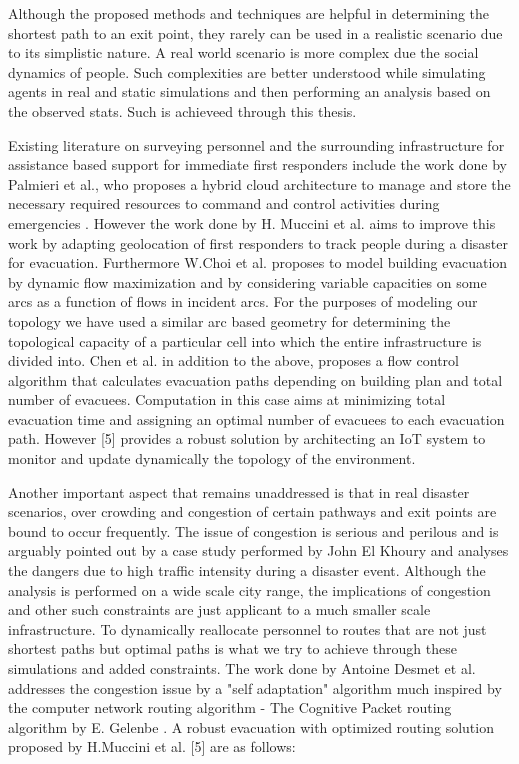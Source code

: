 Although the proposed methods and techniques are helpful in determining the shortest path to an exit point, they rarely can be used in a realistic scenario due to its simplistic nature. A real world scenario is more complex due the social dynamics of people. Such complexities are better understood while simulating agents in real and static simulations and then performing an analysis based on the observed stats. Such is achieveed through this thesis.

Existing literature on surveying personnel and the surrounding infrastructure for assistance based support for immediate first responders include the work done by Palmieri et al., who proposes a hybrid cloud architecture to manage and store the necessary required resources to command and control activities during emergencies \cite{ref14}. However the work done by H. Muccini et al. \cite{ref5} aims to improve this work by adapting geolocation of first responders to track people during a disaster for evacuation. Furthermore W.Choi et al. \cite{ref15} proposes to model building evacuation by dynamic flow maximization and by considering variable capacities on some arcs as a function of flows in incident arcs. For the purposes of modeling our topology we have used a similar arc based geometry for determining the topological capacity of a particular cell into which the entire infrastructure is divided into. Chen et al. \cite{ref16} in addition to the above, proposes a flow control algorithm that calculates evacuation paths depending on building plan and total number of
evacuees. Computation in this case aims at minimizing total evacuation time and assigning an optimal number of evacuees to each evacuation path. However [5] provides a robust solution by architecting an IoT system to monitor and update dynamically the topology of the environment.

Another important aspect that remains unaddressed is that in real disaster scenarios, over crowding and congestion of certain pathways and exit points are bound to occur frequently. The issue of congestion is serious and perilous and is arguably pointed out by a case study performed by John El Khoury \cite{ref17} and analyses the dangers due to high traffic intensity during a disaster event. Although the analysis is performed on a wide scale city range, the implications of congestion and other such constraints are just applicant to a much smaller scale infrastructure. To dynamically reallocate personnel to routes that are not just shortest paths but optimal paths is what we try to achieve through these simulations and added constraints. The work done by Antoine Desmet et al. \cite{ref18} addresses the congestion issue by a "self adaptation" algorithm much inspired by the computer network routing algorithm - The Cognitive Packet routing algorithm by E. Gelenbe \cite{ref19}. A robust evacuation with optimized routing solution proposed by H.Muccini et al. [5] are as follows:

